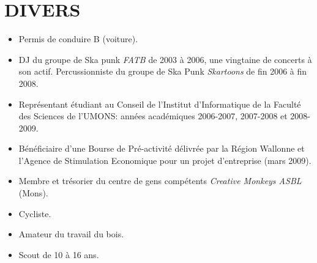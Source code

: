 \section{DIVERS}

\begin{itemize}

\item Permis de conduire B (voiture).

\item DJ du groupe de Ska punk \emph{FATB} de 2003 à 2006, une vingtaine de
concerts à son actif. Percussionniste du groupe de Ska Punk \emph{Skartoons}
de fin 2006 à fin 2008.

\item Représentant étudiant au Conseil de l'Institut d'Informatique
de la Faculté des Sciences de l'UMONS: années académiques 2006-2007,
2007-2008 et 2008-2009.

\item Bénéficiaire d'une Bourse de Pré-activité délivrée par la Région Wallonne
et l'Agence de Stimulation Economique pour un projet d'entreprise (mars 2009).

\item Membre et trésorier du centre de gens compétents \emph{Creative Monkeys ASBL} (Mons).

\item Cycliste.
\item Amateur du travail du bois.
\item Scout de 10 à 16 ans.

\end{itemize}

